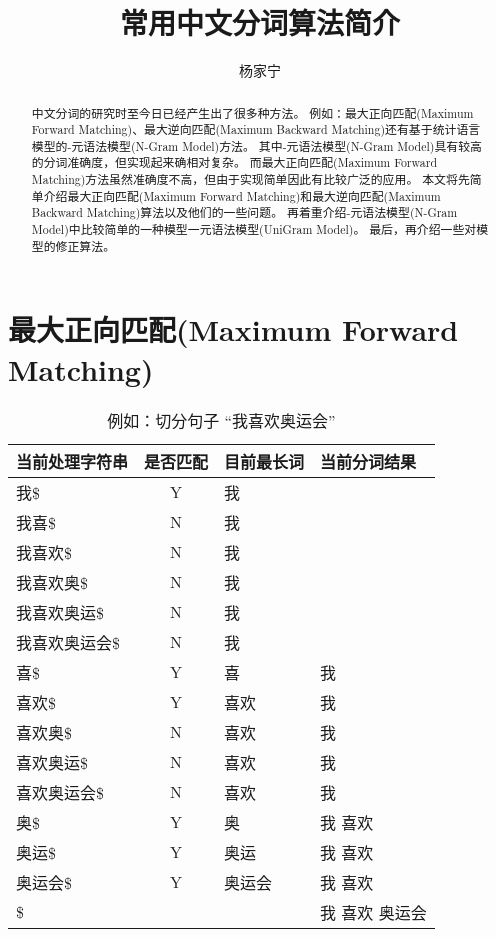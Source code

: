 \documentclass[12pt,a4paper]{article}
\title{常用中文分词算法简介}
\author{杨家宁}
\def\chinese{
	\setmonofont{黑体}
	\setsansfont{微软雅黑}
	\setmainfont{宋体}
}
\def\maxforward{{\cn 最大正向匹配{\en(Maximum Forward Matching)}}}
\def\maxbackward{{\cn 最大逆向匹配{\en(Maximum Backward Matching)}}}
\def\NGram{{\cn {\en N}-元语法模型{\en(N-Gram Model)}}}
\def\UniGram{{\cn 一元语法模型{\en(UniGram Model)}}}
\begin{document}
\chinese
\maketitle

\def\abstractname{\bf 摘~~要}
\begin{abstract}
中文分词的研究时至今日已经产生出了很多种方法。
例如：\maxforward 、\maxbackward 还有基于统计语言模型的\NGram 方法。
其中\NGram 具有较高的分词准确度，但实现起来确相对复杂。
而\maxforward 方法虽然准确度不高，但由于实现简单因此有比较广泛的应用。
本文将先简单介绍\maxforward 和\maxbackward 算法以及他们的一些问题。
再着重介绍\NGram 中比较简单的一种模型\UniGram 。
最后，再介绍一些对模型的修正算法。
\end{abstract}

\section{\maxforward}
\begin{table}
\caption{例如：切分句子 “我喜欢奥运会”}
\label{tbl_maxforward}
	\begin{center}
		\begin{tabular}{l|c|l|l}
			当前处理字符串 & 是否匹配    & 目前最长词 & 当前分词结果   \\
			\hline
			我\$           & {\en Y}  & 我         &                \\
			我喜\$         & {\en N}  & 我         &                \\
			我喜欢\$       & {\en N}  & 我         &                \\
			我喜欢奥\$     & {\en N}  & 我         &                \\
			我喜欢奥运\$   & {\en N}  & 我         &                \\
			我喜欢奥运会\$ & {\en N}  & 我         &                \\
			喜\$           & {\en Y}  & 喜         & 我             \\ 
			喜欢\$         & {\en Y}  & 喜欢       & 我             \\ 
			喜欢奥\$       & {\en N}  & 喜欢       & 我             \\ 
			喜欢奥运\$     & {\en N}  & 喜欢       & 我             \\ 
			喜欢奥运会\$   & {\en N}  & 喜欢       & 我             \\ 
			奥\$           & {\en Y}  & 奥         & 我 喜欢        \\ 
			奥运\$         & {\en Y}  & 奥运       & 我 喜欢        \\ 
			奥运会\$       & {\en Y}  & 奥运会     & 我 喜欢        \\ 
		    \$             &             &            & 我 喜欢 奥运会 \\
		\end{tabular}
	\end{center}
\end{table}
\end{document}
